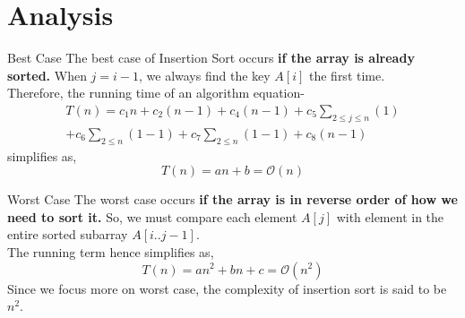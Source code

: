 \documentclass[12pt, aspectratio=54, xcolor=table]{beamer}
\begin{document}
\section{Analysis}
\begin{frame}{Best Case}
The \textcolor{codegreen}{best case} of Insertion Sort occurs \textbf{if the array is already sorted.} When $j=i-1$, we always find the key $A[i]$ the first time.\\
Therefore, the running time of an algorithm equation-
\begin{equation*}
	\begin{multlined}
	T(n)= c_1n+c_2(n-1)+c_4(n-1)+c_5\sum_{2\leq j\leq n}^{}(1) \\ +c_6\sum_{2\leq n}^{}(1-1)+c_7\sum_{2\leq n}^{}(1-1)+c_8(n-1)
		\end{multlined}
\end{equation*}
simplifies as,\\
\begin{equation*}
	T(n)= an+b= 
	\mathcal{O}(n)
\end{equation*}
	
    
\end{frame}

\begin{frame}{Worst Case}
	The \textcolor{cadmiumred}{worst case} occurs \textbf{if the array is in reverse order of how we need to sort it.} So, we must compare each element $A[j]$ with element in the entire sorted subarray $A[i .. j-1]$.\\
	The running term hence simplifies as,
	\begin{equation*}
		T(n)= an^2+bn+c= 
		\mathcal{O}(n^2)
	\end{equation*}
Since we focus more on worst case, the complexity of insertion sort is said to be \textbf{\textit{$n^2$}}.
\end{frame}
\end{document}
